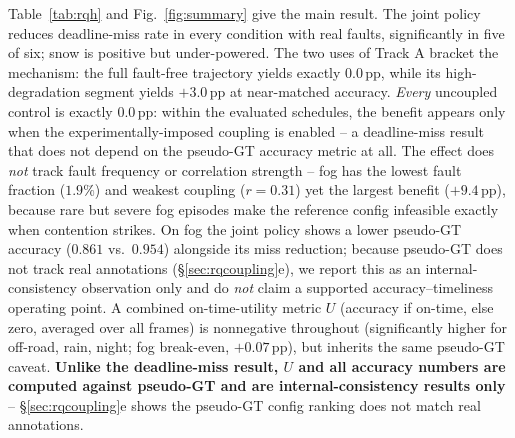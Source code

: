 \documentclass[conference]{IEEEtran}
\begin{document}
Table~\ref{tab:rqh} and Fig.~\ref{fig:summary} give the main result.
The joint policy reduces deadline-miss rate in every condition with
real faults, significantly in five of six; snow is positive but
under-powered. The two uses of Track A bracket the mechanism: the
full fault-free trajectory yields exactly $0.0$\,pp, while its
high-degradation segment yields $+3.0$\,pp at near-matched accuracy.
\emph{Every} uncoupled control is exactly $0.0$\,pp: within the
evaluated schedules, the benefit appears only when the
experimentally-imposed coupling is enabled -- a deadline-miss result
that does not depend on the pseudo-GT accuracy metric at all. The effect does \emph{not} track
fault frequency or correlation strength -- fog has the lowest fault
fraction ($1.9\%$) and weakest coupling ($r{=}0.31$) yet the largest
benefit ($+9.4$\,pp), because rare but severe fog episodes make the
reference config infeasible exactly when contention strikes. On fog
the joint policy shows a lower pseudo-GT accuracy ($0.861$ vs.\ $0.954$)
alongside its miss reduction; because pseudo-GT does not track real
annotations (\S\ref{sec:rqcoupling}e), we report this as an
internal-consistency observation only and do \emph{not} claim a supported
accuracy--timeliness operating point. A combined on-time-utility metric
$U$ (accuracy if on-time, else zero, averaged over all frames) is
nonnegative throughout (significantly higher for off-road, rain, night;
fog break-even, $+0.07$\,pp), but inherits the same pseudo-GT caveat.
\textbf{Unlike the deadline-miss result, $U$ and all accuracy numbers
are computed against pseudo-GT and are internal-consistency results
only} -- \S\ref{sec:rqcoupling}e shows the pseudo-GT config ranking
does not match real annotations.
\end{document}
